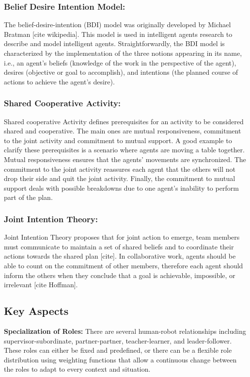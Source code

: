 \subsubsection*{Belief Desire Intention Model:} The belief-desire-intention (BDI) model was originally developed by Michael Bratman [cite wikipedia]. This model is used in intelligent agents research to describe and model intelligent agents. Straightforwardly, the BDI model is characterized by the implementation of the three notions appearing in its name, i.e., an agent's beliefs (knowledge of the work in the perspective of the agent), desires (objective or goal to accomplish), and intentions (the planned course of actions to achieve the agent's desire). 

\subsubsection*{Shared Cooperative Activity:} Shared cooperative Activity defines prerequisites for an activity to be considered shared and cooperative. The main ones are mutual responsiveness, commitment to the joint activity and commitment to mutual support. A good example to clarify these prerequisites is a scenario where agents are moving a table together. Mutual responsiveness ensures that the agents' movements are synchronized. The commitment to the joint activity reassures each agent that the others will not drop their side and quit the joint activity. Finally, the commitment to mutual support deals with possible breakdowns due to one agent's inability to perform part of the plan.  

\subsubsection*{Joint Intention Theory:} Joint Intention Theory proposes that for joint action to emerge, team members must communicate to maintain a set of shared beliefs and to coordinate their actions towards the shared plan [cite]. In collaborative work, agents should be able to count on the commitment of other members, therefore each agent should inform the others when they conclude that a goal is achievable, impossible, or irrelevant [cite Hoffman].

\subsection{Key Aspects}

\textbf{Specialization of Roles:} There are several human-robot relationships including supervisor-subordinate, partner-partner, teacher-learner, and leader-follower. These roles can either be fixed and predefined, or there can be a flexible role distribution using weighting functions that allow a continuous change between the roles to adapt to every context and situation.

